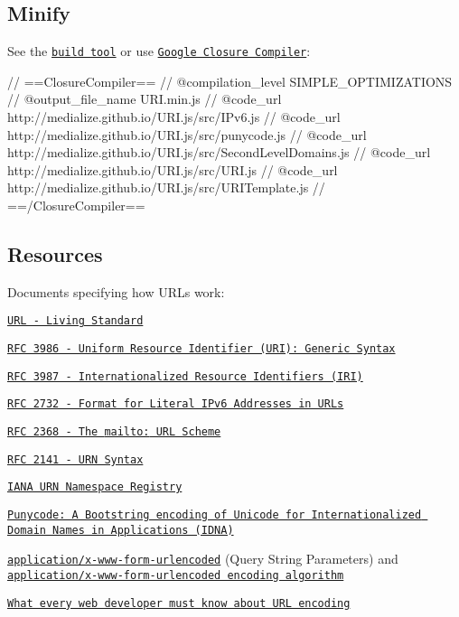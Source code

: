 \subsection*{Minify}

See the \href{http://medialize.github.io/URI.js/build.html}{\tt build tool} or use \href{http://closure-compiler.appspot.com/home}{\tt Google Closure Compiler}\+:


\begin{DoxyCode}
// ==ClosureCompiler==
// @compilation\_level SIMPLE\_OPTIMIZATIONS
// @output\_file\_name URI.min.js
// @code\_url http://medialize.github.io/URI.js/src/IPv6.js
// @code\_url http://medialize.github.io/URI.js/src/punycode.js
// @code\_url http://medialize.github.io/URI.js/src/SecondLevelDomains.js
// @code\_url http://medialize.github.io/URI.js/src/URI.js
// @code\_url http://medialize.github.io/URI.js/src/URITemplate.js
// ==/ClosureCompiler==
\end{DoxyCode}


\subsection*{Resources}

Documents specifying how U\+R\+Ls work\+:


\begin{DoxyItemize}
\item \href{http://url.spec.whatwg.org/}{\tt U\+RL -\/ Living Standard}
\item \href{http://tools.ietf.org/html/rfc3986}{\tt R\+FC 3986 -\/ Uniform Resource Identifier (U\+RI)\+: Generic Syntax}
\item \href{http://tools.ietf.org/html/rfc3987}{\tt R\+FC 3987 -\/ Internationalized Resource Identifiers (I\+RI)}
\item \href{http://tools.ietf.org/html/rfc2732}{\tt R\+FC 2732 -\/ Format for Literal I\+Pv6 Addresses in U\+RL\textquotesingle{}s}
\item \href{https://www.ietf.org/rfc/rfc2368.txt}{\tt R\+FC 2368 -\/ The {\ttfamily mailto\+:} U\+RL Scheme}
\item \href{https://www.ietf.org/rfc/rfc2141.txt}{\tt R\+FC 2141 -\/ U\+RN Syntax}
\item \href{http://www.iana.org/assignments/urn-namespaces/urn-namespaces.xhtml}{\tt I\+A\+NA U\+RN Namespace Registry}
\item \href{http://tools.ietf.org/html/rfc3492}{\tt Punycode\+: A Bootstring encoding of Unicode for Internationalized Domain Names in Applications (I\+D\+NA)}
\item \href{http://www.w3.org/TR/REC-html40/interact/forms.html#form-content-type}{\tt application/x-\/www-\/form-\/urlencoded} (Query String Parameters) and \href{http://www.whatwg.org/specs/web-apps/current-work/multipage/association-of-controls-and-forms.html#application/x-www-form-urlencoded-encoding-algorithm}{\tt application/x-\/www-\/form-\/urlencoded encoding algorithm}
\item \href{http://blog.lunatech.com/2009/02/03/what-every-web-developer-must-know-about-url-encoding}{\tt What every web developer must know about U\+RL encoding}
\end{DoxyItemize}

